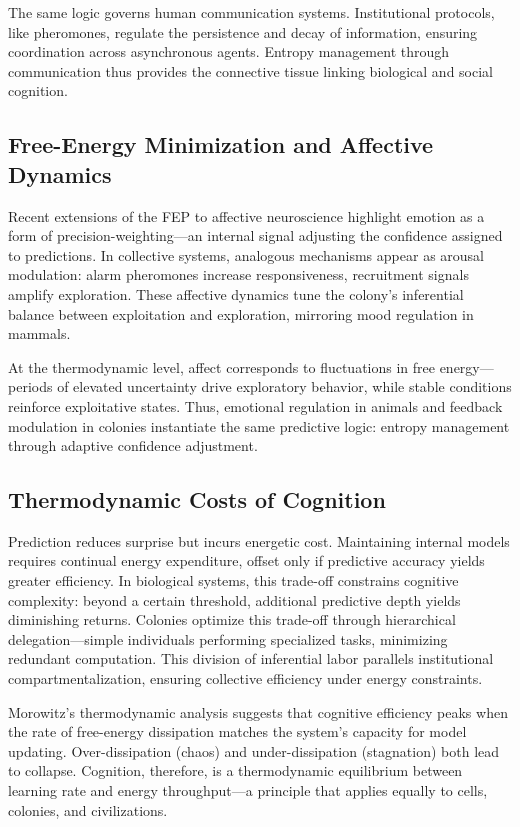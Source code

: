 \documentclass[11pt,a4paper]{article}
\begin{document}
The same logic governs human communication systems.  Institutional protocols, like pheromones, regulate the persistence and decay of information, ensuring coordination across asynchronous agents.  Entropy management through communication thus provides the connective tissue linking biological and social cognition.

\subsection{Free-Energy Minimization and Affective Dynamics}

Recent extensions of the FEP to affective neuroscience \citep{Vasileiou2023ArousalCoherence, Smith2023FeelingOurPlace} highlight emotion as a form of precision-weighting—an internal signal adjusting the confidence assigned to predictions.  In collective systems, analogous mechanisms appear as arousal modulation: alarm pheromones increase responsiveness, recruitment signals amplify exploration.  These affective dynamics tune the colony’s inferential balance between exploitation and exploration, mirroring mood regulation in mammals.

At the thermodynamic level, affect corresponds to fluctuations in free energy—periods of elevated uncertainty drive exploratory behavior, while stable conditions reinforce exploitative states.  Thus, emotional regulation in animals and feedback modulation in colonies instantiate the same predictive logic: entropy management through adaptive confidence adjustment.

\subsection{Thermodynamic Costs of Cognition}

Prediction reduces surprise but incurs energetic cost.  Maintaining internal models requires continual energy expenditure, offset only if predictive accuracy yields greater efficiency.  In biological systems, this trade-off constrains cognitive complexity: beyond a certain threshold, additional predictive depth yields diminishing returns.  Colonies optimize this trade-off through hierarchical delegation—simple individuals performing specialized tasks, minimizing redundant computation.  This division of inferential labor parallels institutional compartmentalization, ensuring collective efficiency under energy constraints.

Morowitz’s thermodynamic analysis \citep{Morowitz1968EnergyFlowBiology} suggests that cognitive efficiency peaks when the rate of free-energy dissipation matches the system’s capacity for model updating.  Over-dissipation (chaos) and under-dissipation (stagnation) both lead to collapse.  Cognition, therefore, is a thermodynamic equilibrium between learning rate and energy throughput—a principle that applies equally to cells, colonies, and civilizations.
\end{document}

